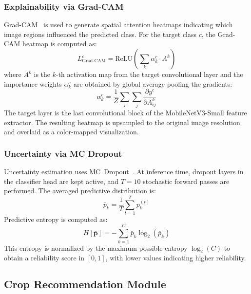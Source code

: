 \documentclass[conference]{IEEEtran}
\begin{document}
\subsubsection{Explainability via Grad-CAM}
Grad-CAM~\cite{selvaraju2017grad} is used to generate spatial attention heatmaps indicating which image regions influenced the predicted class. For the target class $c$, the Grad-CAM heatmap is computed as:
\begin{equation}
  L_{\text{Grad-CAM}}^{c} = \text{ReLU}\!\left(\sum_{k} \alpha_{k}^{c} \cdot A^{k}\right)
\end{equation}
where $A^{k}$ is the $k$-th activation map from the target convolutional layer and the importance weights $\alpha_{k}^{c}$ are obtained by global average pooling the gradients:
\begin{equation}
  \alpha_{k}^{c} = \frac{1}{Z} \sum_{i} \sum_{j} \frac{\partial y^{c}}{\partial A_{ij}^{k}}
\end{equation}
The target layer is the last convolutional block of the MobileNetV3-Small feature extractor. The resulting heatmap is upsampled to the original image resolution and overlaid as a color-mapped visualization.

\subsubsection{Uncertainty via MC Dropout}
Uncertainty estimation uses MC~Dropout~\cite{gal2016dropout}. At inference time, dropout layers in the classifier head are kept active, and $T = 10$ stochastic forward passes are performed. The averaged predictive distribution is:
\begin{equation}
  \bar{p}_{k} = \frac{1}{T} \sum_{t=1}^{T} p_{k}^{(t)}
\end{equation}
Predictive entropy is computed as:
\begin{equation}
  H[\bar{\mathbf{p}}] = -\sum_{k=1}^{C} \bar{p}_{k} \log_{2}(\bar{p}_{k})
\end{equation}
This entropy is normalized by the maximum possible entropy $\log_{2}(C)$ to obtain a reliability score in $[0, 1]$, with lower values indicating higher reliability.

\subsection{Crop Recommendation Module}
\label{subsec:crop_method}
\end{document}

